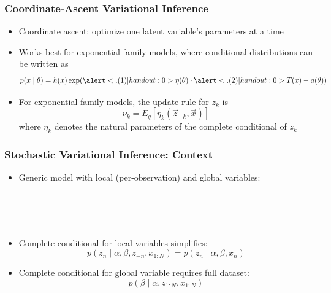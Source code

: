 \documentclass{beamer}
\begin{document}
\begin{frame}
\frametitle{Coordinate-Ascent Variational Inference}
\begin{itemize}[<+->]
\item Coordinate ascent: optimize one latent variable's parameters at a time
\item Works best for exponential-family models, where conditional distributions can be written as
\[ p(x \mid \theta) = h(x) \exp( \alert<.(1)| handout:0>{\eta(\theta)} \cdot \alert<.(2)| handout:0>{T(x)} - a(\theta)) \]
 \pause
\item For exponential-family models, the update rule for $z_k$ is
\[ \nu_k = E_q[\eta_k(\vec z_{-k}, \vec x)] \]
where $\eta_k$ denotes the natural parameters of the complete conditional of $z_k$
\end{itemize}
\end{frame}

\begin{frame}
\frametitle{Stochastic Variational Inference: Context}
\begin{itemize}[<+->]
\item Generic model with local (per-observation) and global variables:
\begin{center}
\end{center}
 \\
 \\
 \\
\item Complete conditional for local variables simplifies:
\[ p(z_n \mid \alpha, \beta, z_{-n}, x_{1:N}) = p(z_n \mid \alpha, \beta, x_n) \]
\item Complete conditional for global variable requires full dataset:
\[ p(\beta \mid \alpha, z_{1:N}, x_{1:N}) \]
\end{itemize}
\end{frame}
\end{document}
